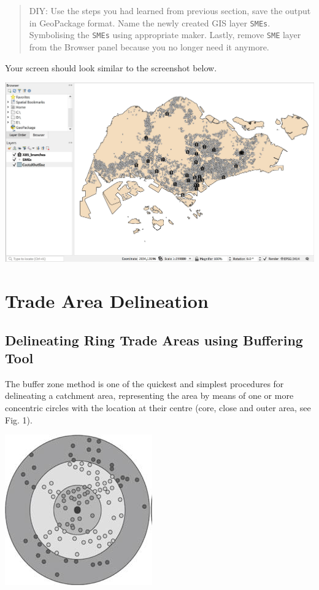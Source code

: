 \documentclass[
  letterpaper,
  DIV=11,
  numbers=noendperiod]{scrreprt}
\begin{document}
\begin{quote}
DIY: Use the steps you had learned from previous section, save the
output in GeoPackage format. Name the newly created GIS layer
\texttt{SMEs}. Symbolising the \texttt{SMEs} using appropriate maker.
Lastly, remove \texttt{SME} layer from the Browser panel because you no
longer need it anymore.
\end{quote}

Your screen should look similar to the screenshot below.

\includegraphics{./img05/image13.jpg}

\hypertarget{trade-area-delineation}{%
\section{Trade Area Delineation}\label{trade-area-delineation}}

\hypertarget{delineating-ring-trade-areas-using-buffering-tool}{%
\subsection{Delineating Ring Trade Areas using Buffering
Tool}\label{delineating-ring-trade-areas-using-buffering-tool}}

The buffer zone method is one of the quickest and simplest procedures
for delineating a catchment area, representing the area by means of one
or more concentric circles with the location at their centre (core,
close and outer area, see Fig. 1).

\includegraphics{./img05/image14.jpg}
\end{document}
